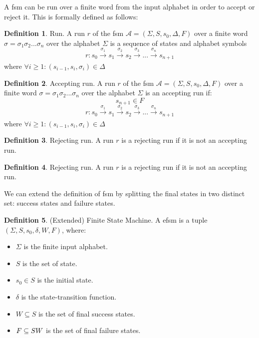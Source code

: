 \documentclass[12pt]{article}
\theoremstyle{definition}
\newtheorem{definition}{Definition}[section]
\theoremstyle{definition}
\theoremstyle{remark}
\newcommand{\A}{\mathcal{A}}
\begin{document}
A \gls{fsm} can be run over a finite word from the input alphabet in order to accept or reject it. This is formally defined as follows:

\theoremstyle{definition}
\begin{definition}{Run.} A run $r$ of the \gls{fsm} $\A = (\Sigma, S, s_{0}, \Delta, F)$ over a finite word $\sigma = \sigma_1 \sigma_2 ... \sigma_n$ over the alphabet $\Sigma$ is a sequence of states and alphabet symbols
$$r: s_0 \xrightarrow[]{\sigma_1} s_1 \xrightarrow[]{\sigma_2} s_2 \xrightarrow[]{\sigma_3} ... \xrightarrow[]{\sigma_n} s_{n+1}$$ where $\forall i \ge 1: (s_{i-1}, s_i, \sigma_i) \in \Delta$
\end{definition}

\theoremstyle{definition}
\begin{definition}{Accepting run.} A run $r$ of the \gls{fsm} $\A = (\Sigma, S, s_{0}, \Delta, F)$ over a finite word $\sigma = \sigma_1 \sigma_2 ... \sigma_n$ over the alphabet $\Sigma$ is an accepting run if:
$$s_{n+1} \in F$$
$$r: s_0 \xrightarrow[]{\sigma_1} s_1 \xrightarrow[]{\sigma_2} s_2 \xrightarrow[]{\sigma_3} ... \xrightarrow[]{\sigma_n} s_{n+1}$$ where $\forall i \ge 1: (s_{i-1}, s_i, \sigma_i) \in \Delta$
\end{definition}

\theoremstyle{definition}
\begin{definition}{Rejecting run.} A run $r$ is a rejecting run if it is not an accepting run.
\end{definition}

\theoremstyle{definition}
\begin{definition}{Rejecting run.} A run $r$ is a rejecting run if it is not an accepting run.
\end{definition}

We can extend the definition of \gls{fsm} by splitting the final states in two distinct set: success states and failure states.

\theoremstyle{definition}
\begin{definition}{(Extended) Finite State Machine.} A \gls{efsm} is a tuple $(\Sigma, S, s_{0},\delta, W, F)$, where:
\begin{itemize}
\item $\Sigma$ is the finite input alphabet.
\item $S$ is the set of state.
\item $s_{0} \in S$ is the initial state.
\item $\delta$ is the state-transition function.
\item $W \subseteq S$ is the set of final success states.
\item $F \subseteq S \\ W$ is the set of final failure states.
\end{itemize}
\end{definition}
\end{document}
